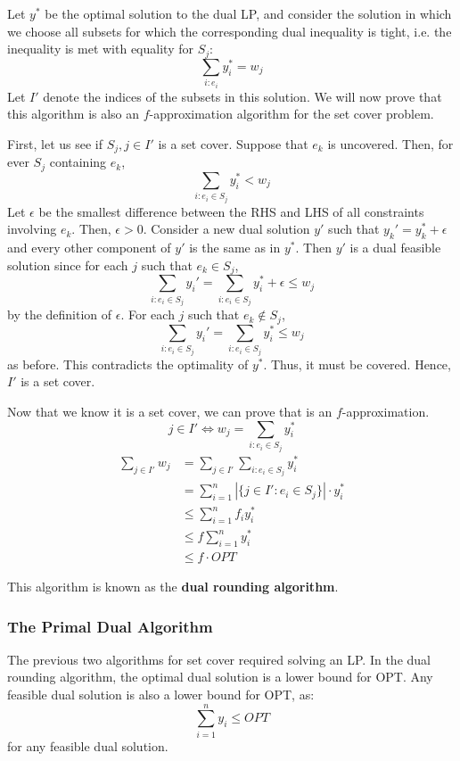 \documentclass[12pt,letterpaper]{article}
\theoremstyle{definition}
\begin{document}
Let $y^*$ be the optimal solution to the dual LP, and consider the solution in which we choose all subsets for which the corresponding dual inequality is tight, i.e. the inequality is met with equality for $S_j$:
\[\sum_{i : e_i} y_i^* = w_j\]
Let $I'$ denote the indices of the subsets in this solution. We will now prove that this algorithm is also an $f$-approximation algorithm for the set cover problem.

First, let us see if $S_j, j \in I'$ is a set cover. Suppose that $e_k$ is uncovered. Then, for ever $S_j$ containing $e_k$,
\[\sum_{i : e_i \in S_j} y_i^* < w_j\]
Let $\epsilon$ be the smallest difference between the RHS and LHS of all constraints involving $e_k$. Then, $\epsilon > 0$. Consider a new dual solution $y'$ such that $y_k' = y_k^* + \epsilon$ and every other component of $y'$ is the same as in $y^*$. Then $y'$ is a dual feasible solution since for each $j$ such that $e_k \in S_j$,
\[\sum_{i : e_i \in S_j} y_i' = \sum_{i : e_i \in S_j} y_i^* + \epsilon \leq w_j\]
by the definition of $\epsilon$. For each $j$ such that $e_k \notin S_j$,
\[\sum_{i : e_i \in S_j} y_i' = \sum_{i : e_i \in S_j} y_i^* \leq w_j\]
as before. This contradicts the optimality of $y^*$. Thus, it must be covered. Hence, $I'$ is a set cover.

Now that we know it is a set cover, we can prove that is an $f$-approximation.
\[j \in I' \Leftrightarrow w_j = \sum_{i : e_i \in S_j} y_i^*\]
\begin{align*}
  \sum_{j \in I'} w_j &= \sum_{j \in I'} \sum_{i : e_i \in S_j} y_i^* \\
                      &= \sum_{i=1}^{n} |\{j \in I' : e_i \in S_j\}| \cdot y_i^* \\
                      &\leq \sum_{i=1}^n f_i y_i^* \\
                      &\leq f \sum_{i=1}^n y_i^* \\
                      &\leq f \cdot OPT
\end{align*}

This algorithm is known as the \textbf{dual rounding algorithm}.

\subsubsection{The Primal Dual Algorithm}

The previous two algorithms for set cover required solving an LP. In the dual rounding algorithm, the optimal dual solution is a lower bound for OPT. Any feasible dual solution is also a lower bound for OPT, as:
\[\sum_{i=1}^n y_i \leq OPT\]
for any feasible dual solution.
\end{document}
